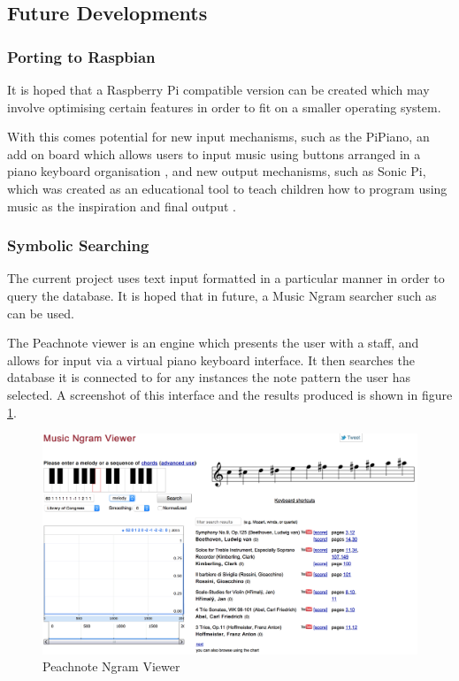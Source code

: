 \subsection{Future Developments}
\subsubsection{Porting to Raspbian}
It is hoped that a Raspberry Pi compatible version can be created which may involve optimising certain features in order to fit on a smaller operating system. 

With this comes potential for new input mechanisms, such as the PiPiano, an add on board which allows users to input music using buttons arranged in a piano keyboard organisation \parencite{pipiano}, and new output mechanisms, such as Sonic Pi, which was created as an educational tool to teach children how to program using music as the inspiration and final output \parencite{sonicpi}. 

\subsubsection{Symbolic Searching}
The current project uses text input formatted in a particular manner in order to query the database. It is hoped that in future, a Music Ngram searcher such as \cite{Peachnote} can be used. 

The Peachnote viewer is an engine which presents the user with a staff, and allows for input via a virtual piano keyboard interface. It then searches the database it is connected to for any instances the note pattern the user has selected. A screenshot of this interface and the results produced is shown in figure \ref{fig:peachnote}.
\begin{figure}[t]
\centering
\includegraphics[width=\textwidth]{peachnote}
\caption{Peachnote Ngram Viewer}
\label{fig:peachnote}	
\end{figure}

